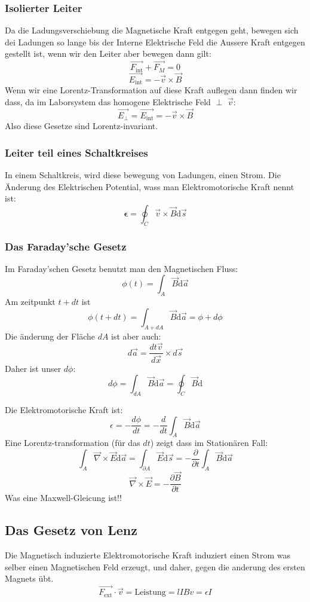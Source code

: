 \documentclass{article}
\begin{document}
\subsubsection*{Isolierter Leiter}
Da die Ladungsverschiebung die Magnetische Kraft entgegen geht, bewegen sich dei Ladungen so lange bis der Interne Elektrische Feld die Aussere Kraft entgegen gestellt ist, wenn wir den Leiter aber bewegen dann gilt:
\[\vec{F_{\text{int}}}+\vec{F_M}=0\]
\[\vec{E_{\text{int}}}=-\vec{v}\times \vec{B }\]
Wenn wir eine Lorentz-Transformation auf diese Kraft auflegen dann finden wir dass, da im Laborsystem das homogene Elektrische Feld $\perp$ $\vec{v}$:
\[\vec{E_\perp}=\vec{E_\text{int}}=-\vec{v}\times \vec{B }\]
Also diese Gesetze sind Lorentz-invariant.
\subsubsection*{Leiter teil eines Schaltkreises}
In einem Schaltkreis, wird diese bewegung von Ladungen, einen Strom. Die Änderung des Elektrischen Potential, wass man Elektromotorische Kraft nennt ist:
\[\mathbf{\epsilon}=\oint^{}_{C }\vec{v}\times \vec{B }\text{d}\vec{s}\]
\subsubsection*{Das Faraday'sche Gesetz}
Im Faraday'schen Gesetz benutzt man den Magnetischen Fluss:
\[\phi(t)=\int^{}_{A}\vec{B }\text{d}\vec{a}\]
Am zeitpunkt $t+dt$ ist \[\phi(t+dt)=\int^{}_{A+dA}\vec{B }\text{d}\vec{a}=\phi+d\phi\]
Die änderung der Fläche $dA$ ist aber auch:
\[d \vec{a}=\frac{dt \vec{v}}{d \vec{x}}\times d \vec{s}\]
Daher ist unser $d\phi$:
\[d\phi=\int^{}_{dA}\vec{B }\text{d}\vec{a}=\oint^{}_{C }\vec{B }\text{d}\]

Die Elektromotorische Kraft ist:
\[\epsilon = -\frac{d\phi}{dt}=-\frac{d }{dt}\int^{}_{A}\vec{B }\text{d}\vec{a}\]
Eine Lorentz-transformation (für das $dt$) zeigt dass im Stationären Fall:
\[\int^{}_{A}\vec{\nabla}\times \vec{E}\text{d}\vec{a}=\int^{}_{\partial A}\vec{E }\text{d}\vec{s}=-\frac{\partial}{\partial t} \int^{}_{A}\vec{B }\text{d}\vec{a}\]
\[\boxed{\vec{\nabla}\times \vec{E}=-\frac{\partial \vec{B}}{\partial t} }\]
Was eine Maxwell-Gleicung ist!!
\subsection*{Das Gesetz von Lenz}
Die Magnetisch induzierte Elektromotorische Kraft induziert einen Strom was selber einen Magnetischen Feld erzeugt, und daher, gegen die anderung des ersten Magnets übt.
\[\vec{F_\text{ext}}\cdot \vec{v}=\text{Leistung}=lIBv= \epsilon I\]
\end{document}
